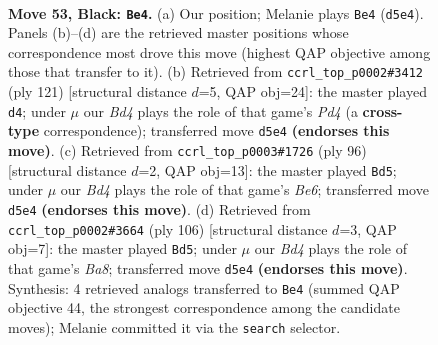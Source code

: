 \documentclass[11pt]{article}
\begin{document}
\clearpage

\begin{figure}[p]\centering
\begin{subfigure}{0.46\textwidth}\centering
\resizebox{\linewidth}{!}{%
\newchessgame
\chessboard[
  setfen={3R4/6k1/8/1ppb4/8/8/8/5K2 b - - 11 53},
  showmover=false,
  pgfstyle=straightmove, color=movearrow, markmove={d5-e4}
]}
\caption{}
\end{subfigure}\hfill
\begin{subfigure}{0.46\textwidth}\centering
\resizebox{\linewidth}{!}{%
\newchessgame
\chessboard[
  setfen={8/3R2b1/6k1/3p4/7p/8/2K5/8 b - - 1 61},
  showmover=false,
  pgfstyle=straightmove, color=movearrow, markmove={d5-d4}
]}
\caption{}
\end{subfigure}
\\[4pt]
\begin{subfigure}{0.46\textwidth}\centering
\resizebox{\linewidth}{!}{%
\newchessgame
\chessboard[
  setfen={1k6/8/4B3/P7/1P6/8/1K6/4r3 w - - 3 49},
  showmover=false,
  pgfstyle=straightmove, color=movearrow, markmove={e6-d5}
]}
\caption{}
\end{subfigure}\hfill
\begin{subfigure}{0.46\textwidth}\centering
\resizebox{\linewidth}{!}{%
\newchessgame
\chessboard[
  setfen={Br6/8/7p/8/8/4k1P1/8/6K1 w - - 4 54},
  showmover=false,
  pgfstyle=straightmove, color=movearrow, markmove={a8-d5}
]}
\caption{}
\end{subfigure}
\caption{\textbf{Move 53, Black: \texttt{Be4}.} (a) Our position; Melanie plays \texttt{Be4} (\texttt{d5e4}). Panels (b)--(d) are the retrieved master positions whose correspondence most drove this move (highest QAP objective among those that transfer to it). (b) Retrieved from \texttt{ccrl\_top\_p0002\#3412} (ply 121) [structural distance $d$=5, QAP obj=24]: the master played \texttt{d4}; under $\mu$ our \emph{Bd4} plays the role of that game's \emph{Pd4} (a \textbf{cross-type} correspondence); transferred move \texttt{d5e4} \textbf{(endorses this move)}. (c) Retrieved from \texttt{ccrl\_top\_p0003\#1726} (ply 96) [structural distance $d$=2, QAP obj=13]: the master played \texttt{Bd5}; under $\mu$ our \emph{Bd4} plays the role of that game's \emph{Be6}; transferred move \texttt{d5e4} \textbf{(endorses this move)}. (d) Retrieved from \texttt{ccrl\_top\_p0002\#3664} (ply 106) [structural distance $d$=3, QAP obj=7]: the master played \texttt{Bd5}; under $\mu$ our \emph{Bd4} plays the role of that game's \emph{Ba8}; transferred move \texttt{d5e4} \textbf{(endorses this move)}. Synthesis: 4 retrieved analogs transferred to \texttt{Be4} (summed QAP objective 44, the strongest correspondence among the candidate moves); Melanie committed it via the \texttt{search} selector.}
\label{fig:thought-m105}
\end{figure}
\end{document}
